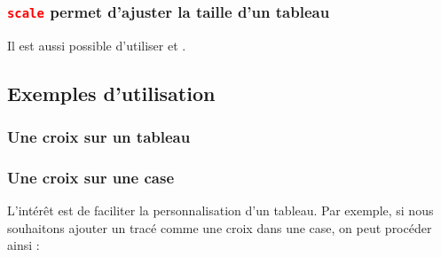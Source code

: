 \subsubsection{\texttt{\textcolor{red}{scale}} permet d'ajuster la taille d'un tableau}


\begin{tkzexample}[width=7cm,small]
\end{tkzexample}

Il est aussi possible d'utiliser   et .

\begin{tkzexample}[width=7cm,small]
\end{tkzexample}


\subsection{Exemples d'utilisation}
\subsubsection{Une croix sur un tableau}

\begin{tkzexample}
\end{tkzexample}

\subsubsection{Une croix sur une case}

L'intérêt est de faciliter la personnalisation d'un tableau. Par exemple, si nous souhaitons ajouter un tracé comme une croix dans une case, on peut procéder ainsi :

